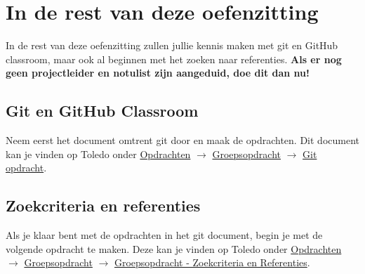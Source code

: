 \documentclass[a4paper]{article}
\begin{document}
\section{In de rest van deze oefenzitting}

In de rest van deze oefenzitting zullen jullie kennis maken met git en GitHub classroom, maar ook al beginnen met het zoeken naar referenties.
\textbf{Als er nog geen projectleider en notulist zijn aangeduid, doe dit dan nu!}


\subsection{Git en GitHub Classroom}

Neem eerst het document omtrent git door en maak de opdrachten.
Dit document kan je vinden op Toledo onder \underline{Opdrachten} $\rightarrow$ \underline{Groepsopdracht} $\rightarrow$ \underline{Git opdracht}.


\subsection{Zoekcriteria en referenties}

Als je klaar bent met de opdrachten in het git document, begin je met de volgende opdracht te maken.
Deze kan je vinden op Toledo onder \underline{Opdrachten} $\rightarrow$ \underline{Groepsopdracht} $\rightarrow$ \uline{Groepsopdracht - Zoekcriteria en Referenties}.



\end{document}
